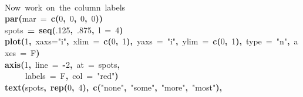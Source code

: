 \documentclass{article}
\makeatletter
\newcommand{\hlnumber}[1]{\textcolor[rgb]{0,0,0}{#1}}%
\newcommand{\hlfunctioncall}[1]{\textcolor[rgb]{0.501960784313725,0,0.329411764705882}{\textbf{#1}}}%
\newcommand{\hlstring}[1]{\textcolor[rgb]{0.6,0.6,1}{#1}}%
\newcommand{\hlkeyword}[1]{\textcolor[rgb]{0,0,0}{\textbf{#1}}}%
\newcommand{\hlargument}[1]{\textcolor[rgb]{0.690196078431373,0.250980392156863,0.0196078431372549}{#1}}%
\newcommand{\hlcomment}[1]{\textcolor[rgb]{0.180392156862745,0.6,0.341176470588235}{#1}}%
\newcommand{\hlassignement}[1]{\textcolor[rgb]{0,0,0}{\textbf{#1}}}%
\newcommand{\hlsymbol}[1]{\textcolor[rgb]{0,0,0}{#1}}%
\newcommand{\hlstd}[1]{\textcolor[rgb]{0,0,0}{#1}}%
\newenvironment{kframe}{%
 \def\FrameCommand##1{\hskip\@totalleftmargin \hskip-\fboxsep
 \colorbox{shadecolor}{##1}\hskip-\fboxsep
     \hskip-\linewidth \hskip-\@totalleftmargin \hskip\columnwidth}%
 \MakeFramed {\advance\hsize-\width
   \@totalleftmargin\z@ \linewidth\hsize
   \@setminipage}}%
 {\par\unskip\endMakeFramed}
\newenvironment{knitrout}{}{} %
\makeatother
\begin{document}
\begin{knitrout}
\begin{kframe}\begin{flushleft}
\ttfamily\noindent
\hspace*{\fill}\\
\hlstd{}\hlcomment{\usebox{\hlnormalsizeboxhash}{\ }Now{\ }work{\ }on{\ }the{\ }column{\ }labels}\hspace*{\fill}\\
\hlstd{}\hlfunctioncall{par}\hlkeyword{(}\hlargument{mar}{\ }\hlargument{=}{\ }\hlfunctioncall{c}\hlkeyword{(}\hlnumber{0}\hlkeyword{,}{\ }\hlnumber{0}\hlkeyword{,}{\ }\hlnumber{0}\hlkeyword{,}{\ }\hlnumber{0}\hlkeyword{)}\hlkeyword{)}\hspace*{\fill}\\
\hlstd{}\hlsymbol{spots}{\ }\hlassignement{=}{\ }\hlfunctioncall{seq}\hlkeyword{(}\hlnumber{.125}\hlkeyword{,}{\ }\hlnumber{.875}\hlkeyword{,}{\ }\hlargument{l}{\ }\hlargument{=}{\ }\hlnumber{4}\hlkeyword{)}\hspace*{\fill}\\
\hlstd{}\hlfunctioncall{plot}\hlkeyword{(}\hlnumber{1}\hlkeyword{,}{\ }\hlargument{xaxs}\hlargument{=}\hlstring{"{}i"{}}\hlkeyword{,}{\ }\hlargument{xlim}{\ }\hlargument{=}{\ }\hlfunctioncall{c}\hlkeyword{(}\hlnumber{0}\hlkeyword{,}{\ }\hlnumber{1}\hlkeyword{)}\hlkeyword{,}{\ }\hlargument{yaxs}{\ }\hlargument{=}{\ }\hlstring{"{}i"{}}\hlkeyword{,}{\ }\hlargument{ylim}{\ }\hlargument{=}{\ }\hlfunctioncall{c}\hlkeyword{(}\hlnumber{0}\hlkeyword{,}{\ }\hlnumber{1}\hlkeyword{)}\hlkeyword{,}{\ }\hlargument{type}{\ }\hlargument{=}{\ }\hlstring{"{}n"{}}\hlkeyword{,}{\ }\hlargument{axes}{\ }\hlargument{=}{\ }\hlsymbol{F}\hlkeyword{)}\hspace*{\fill}\\
\hlstd{}\hlfunctioncall{axis}\hlkeyword{(}\hlnumber{1}\hlkeyword{,}{\ }\hlargument{line}{\ }\hlargument{=}{\ }\hlkeyword{-}\hlnumber{2}\hlkeyword{,}{\ }\hlargument{at}{\ }\hlargument{=}{\ }\hlsymbol{spots}\hlkeyword{,}\hspace*{\fill}\\
\hlstd{}{\ }{\ }{\ }{\ }{\ }\hlargument{labels}{\ }\hlargument{=}{\ }\hlsymbol{F}\hlkeyword{,}{\ }\hlargument{col}{\ }\hlargument{=}{\ }\hlstring{"{}red"{}}\hlkeyword{)}\hspace*{\fill}\\
\hlstd{}\hlfunctioncall{text}\hlkeyword{(}\hlsymbol{spots}\hlkeyword{,}{\ }\hlfunctioncall{rep}\hlkeyword{(}\hlnumber{0}\hlkeyword{,}{\ }\hlnumber{4}\hlkeyword{)}\hlkeyword{,}{\ }\hlfunctioncall{c}\hlkeyword{(}\hlstring{"{}none"{}}\hlkeyword{,}{\ }\hlstring{"{}some"{}}\hlkeyword{,}{\ }\hlstring{"{}more"{}}\hlkeyword{,}{\ }\hlstring{"{}most"{}}\hlkeyword{)}\hlkeyword{,}\hspace*{\fill}\\

\end{flushleft}
\end{kframe}
\end{knitrout}
\end{document}
